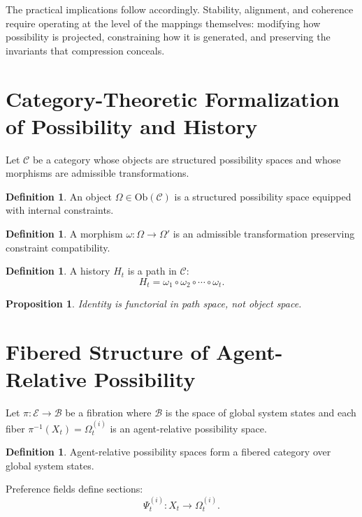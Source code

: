 \documentclass[11pt,a4paper]{article}
\newtheorem{proposition}[theorem]{Proposition}
\theoremstyle{definition}
\newtheorem{definition}[theorem]{Definition}
\theoremstyle{remark}
\begin{document}
The practical implications follow accordingly. Stability, alignment, and coherence require operating at the level of the mappings themselves: modifying how possibility is projected, constraining how it is generated, and preserving the invariants that compression conceals.

\appendix

\section{Category-Theoretic Formalization of Possibility and History}

Let $\mathcal{C}$ be a category whose objects are structured possibility spaces and whose morphisms are admissible transformations.

\begin{definition}
An object $\Omega \in \mathrm{Ob}(\mathcal{C})$ is a structured possibility space equipped with internal constraints.
\end{definition}

\begin{definition}
A morphism $\omega : \Omega \to \Omega'$ is an admissible transformation preserving constraint compatibility.
\end{definition}

\begin{definition}
A history $H_t$ is a path in $\mathcal{C}$:
\[
H_t = \omega_1 \circ \omega_2 \circ \cdots \circ \omega_t.
\]
\end{definition}

\begin{proposition}
Identity is functorial in path space, not object space.
\end{proposition}

\section{Fibered Structure of Agent-Relative Possibility}

Let $\pi : \mathcal{E} \to \mathcal{B}$ be a fibration where $\mathcal{B}$ is the space of global system states and each fiber $\pi^{-1}(X_t) = \Omega_t^{(i)}$ is an agent-relative possibility space.

\begin{definition}
Agent-relative possibility spaces form a fibered category over global system states.
\end{definition}

Preference fields define sections:
\[
\Psi_t^{(i)} : X_t \to \Omega_t^{(i)}.
\]
\end{document}
